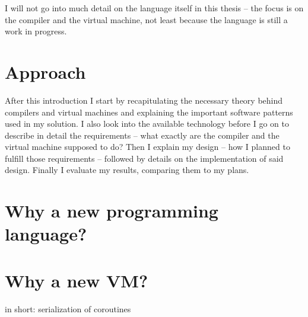 	I will not go into much detail on the language itself in this thesis -- the focus is on the compiler and the virtual machine, not least because the language is still a work in progress.
    
    
	\section{Approach} %
	
	After this introduction I start by recapitulating the necessary theory behind compilers and virtual machines and explaining the important software patterns used in my solution. I also look into the available technology before I go on to describe in detail the requirements -- what exactly are the compiler and the virtual machine supposed to do? Then I explain my design -- how I planned to fulfill those requirements -- followed by details on the implementation of said design. Finally I evaluate my results, comparing them to my plans.
	
	
	\section{Why a new programming language?}
	
	\section{Why a new VM?}
	
	in short: serialization of coroutines
